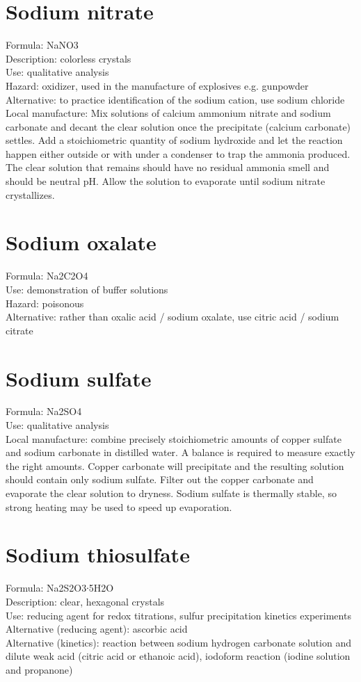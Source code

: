 \section{Sodium nitrate}
Formula: NaNO3\\
Description: colorless crystals\\
Use: qualitative analysis\\
Hazard: oxidizer, 
used in the manufacture of explosives e.g. 
gunpowder\\
Alternative: to practice identification of the sodium cation, 
use sodium chloride\\
Local manufacture: Mix solutions of calcium ammonium nitrate 
and sodium carbonate and decant the clear solution 
once the precipitate (calcium carbonate) settles. 
Add a stoichiometric quantity of sodium hydroxide 
and let the reaction happen either outside 
or with under a condenser to trap the ammonia produced. 
The clear solution that remains should have no residual ammonia smell 
and should be neutral pH. 
Allow the solution to evaporate until sodium nitrate crystallizes.

\section{Sodium oxalate}
Formula: Na2C2O4\\
Use: demonstration of buffer solutions\\
Hazard: poisonous\\
Alternative: rather than oxalic acid / sodium oxalate, 
use citric acid / sodium citrate

\section{Sodium sulfate}
Formula: Na2SO4\\
Use: qualitative analysis\\
Local manufacture: combine precisely stoichiometric amounts 
of copper sulfate and sodium carbonate in distilled water. 
A balance is required to measure exactly the right amounts. 
Copper carbonate will precipitate and the resulting solution 
should contain only sodium sulfate. 
Filter out the copper carbonate and evaporate the clear solution to dryness. 
Sodium sulfate is thermally stable, 
so strong heating may be used to speed up evaporation.

\section{Sodium thiosulfate}
Formula: Na2S2O3∙5H2O\\
Description: clear, 
hexagonal crystals\\
Use: reducing agent for redox titrations, 
sulfur precipitation kinetics experiments\\
Alternative (reducing agent): ascorbic acid\\
Alternative (kinetics): reaction between sodium hydrogen carbonate solution 
and dilute weak acid (citric acid or ethanoic acid), 
iodoform reaction (iodine solution and propanone)\\

